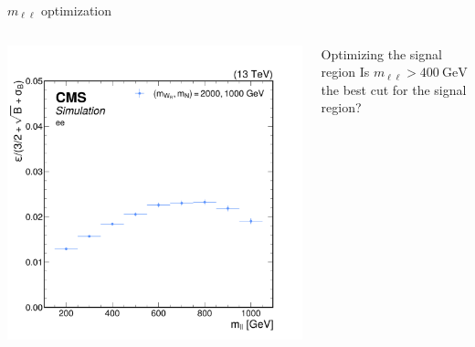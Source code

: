 \documentclass[aspectratio=169]{beamer}
\begin{document}
\begin{frame}{$m_{\ell \ell}$ optimization}
  \begin{columns}
    \begin{column}{0.50\textwidth}
      \centering
      \includegraphics[width=\textwidth]{../figures/analysis/mll-optimization.png}
    \end{column}
    \begin{column}{0.50\textwidth}
        \centering
        \resizebox{\columnwidth}{!}{%
        }
      \begin{block}{Optimizing the signal region}
        Is $m_{\ell \ell} > 400 \mathrm{~GeV}$ the best cut for the signal region?
      \end{block}
    \end{column}
  \end{columns}
\end{frame}
\end{document}
